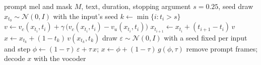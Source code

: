 \begin{algorithm}[!htbp]
\caption{Released teacher-guided sampler of DMOSpeech~2 (baseline)}
\label{alg:baseline}
\small
\begin{algorithmic}[1]
\Require prompt mel and mask $M$, text, duration, stopping argument $s=0.25$, seed
\State draw $x_{t_0}\sim\mathcal{N}(0,I)$ with the input's seed
\State $k \gets \min\{i : t_i > s\}$ 
  \State $v \gets v_c(x_{t_i},t_i) + \gamma\,\big(v_c(x_{t_i},t_i) - v_u(x_{t_i},t_i)\big)$ 
  \State $x_{t_{i+1}} \gets x_{t_i} + (t_{i+1}-t_i)\,v$ 
\EndFor
\State $x \gets x_{t_k} + (1-t_k)\,v(x_{t_k},t_k)$ 
 
  \State draw $\varepsilon\sim\mathcal{N}(0,I)$ with a seed fixed per input and step
  \State $\phi \gets (1-\tau)\,\varepsilon + \tau\,x$; \quad $x \gets \phi + (1-\tau)\,g(\phi,\tau)$ 
\EndFor
\State remove prompt frames; decode $x$ with the vocoder
\end{algorithmic}
\end{algorithm}


